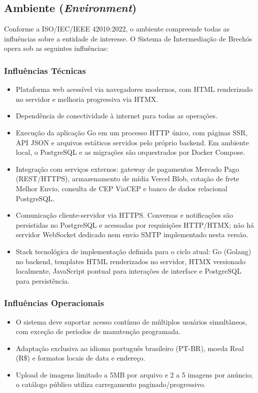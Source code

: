 ﻿\documentclass[12pt,a4paper]{article}
\begin{document}
\subsection{Ambiente (\textit{Environment})}

Conforme a ISO/IEC/IEEE 42010:2022, o ambiente compreende todas as influências sobre a entidade de interesse. O Sistema de Intermediação de Brechós opera sob as seguintes influências:

\subsubsection{Influências Técnicas}
\begin{itemize}[noitemsep]
    \item Plataforma web acessível via navegadores modernos, com HTML renderizado no servidor e melhoria progressiva via HTMX.
    \item Dependência de conectividade à internet para todas as operações.
    \item Execução da aplicação Go em um processo HTTP único, com páginas SSR, API JSON e arquivos estáticos servidos pelo próprio backend. Em ambiente local, o PostgreSQL e as migrações são orquestrados por Docker Compose.
    \item Integração com serviços externos: gateway de pagamentos Mercado Pago (REST/HTTPS), armazenamento de mídia Vercel Blob, cotação de frete Melhor Envio, consulta de CEP ViaCEP e banco de dados relacional PostgreSQL.
    \item Comunicação cliente-servidor via HTTPS. Conversas e notificações são persistidas no PostgreSQL e acessadas por requisições HTTP/HTMX; não há servidor WebSocket dedicado nem envio SMTP implementado nesta versão.
    \item Stack tecnológica de implementação definida para o ciclo atual: Go (Golang) no backend, templates HTML renderizados no servidor, HTMX versionado localmente, JavaScript pontual para interações de interface e PostgreSQL para persistência.
\end{itemize}

\subsubsection{Influências Operacionais}
\begin{itemize}[noitemsep]
    \item O sistema deve suportar acesso contínuo de múltiplos usuários simultâneos, com exceção de períodos de manutenção programada.
    \item Adaptação exclusiva ao idioma português brasileiro (PT-BR), moeda Real (R\$) e formatos locais de data e endereço.
    \item Upload de imagens limitado a 5MB por arquivo e 2 a 5 imagens por anúncio; o catálogo público utiliza carregamento paginado/progressivo.
\end{itemize}
\end{document}
